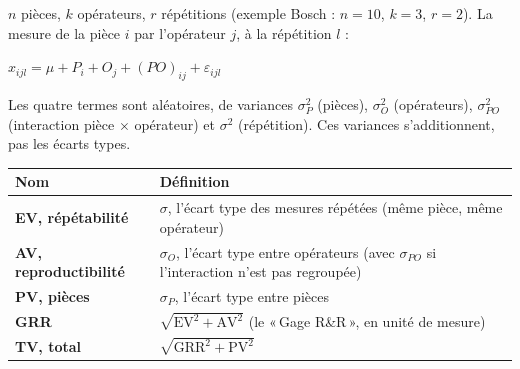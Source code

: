 \documentclass[10pt,a4paper]{article}
\newcommand{\stitre}[1]{\par\vspace{1pt}{\color{uimm}\bfseries\large #1}\par\vspace{-7pt}{\color{cyan}\rule{\linewidth}{0.9pt}}\par\vspace{-3pt}}
\begin{document}
\thispagestyle{fancy}
\fontsize{9}{10.5}\selectfont
{}
\vspace{2pt}

\stitre{1. Le modèle}
$n$ pièces, $k$ opérateurs, $r$ répétitions (exemple Bosch : $n=10$, $k=3$, $r=2$). La mesure de la pièce $i$ par l'opérateur $j$, à la répétition $l$ :
\begin{center}\vspace{-3pt}$x_{ijl}=\mu+P_i+O_j+(PO)_{ij}+\varepsilon_{ijl}$\vspace{-2pt}\end{center}
Les quatre termes sont aléatoires, de variances $\sigma_P^2$ (pièces), $\sigma_O^2$ (opérateurs), $\sigma_{PO}^2$ (interaction pièce $\times$ opérateur) et $\sigma^2$ (répétition). Ces variances s'additionnent, pas les écarts types.\par\vspace{3pt}
\renewcommand{\arraystretch}{1.08}
\begin{tabularx}{\linewidth}{|>{\bfseries}p{37mm}|>{\raggedright\arraybackslash}X|}\hline
\rowcolor{uimm}\color{white}\textbf{Nom} & \color{white}\textbf{Définition}\\\hline
EV, répétabilité & $\sigma$, l'écart type des mesures répétées (même pièce, même opérateur)\\\hline
AV, reproductibilité & $\sigma_O$, l'écart type entre opérateurs (avec $\sigma_{PO}$ si l'interaction n'est pas regroupée)\\\hline
PV, pièces & $\sigma_P$, l'écart type entre pièces\\\hline
GRR & $\sqrt{\mathrm{EV}^2+\mathrm{AV}^2}$ \quad (le «\,Gage R\&R\,», en unité de mesure)\\\hline
TV, total & $\sqrt{\mathrm{GRR}^2+\mathrm{PV}^2}$\\\hline
\end{tabularx}
\end{document}

